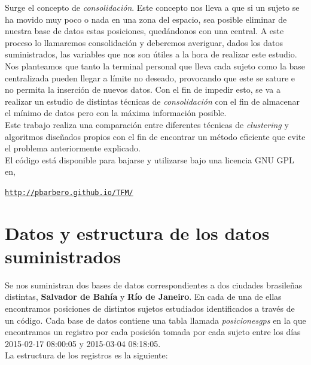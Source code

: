 \documentclass[a4paper, 12pt]{article}
\begin{document}
Surge el concepto de \textit{consolidaci\'on}. Este concepto nos lleva a que si un sujeto se ha movido muy poco o nada en una zona del espacio, sea posible eliminar de nuestra base de datos estas posiciones, qued\'andonos con una central. A este proceso lo llamaremos consolidaci\'on y deberemos averiguar, dados los datos suministrados, las variables que nos son \'utiles a la hora de realizar este estudio.\\

Nos planteamos que tanto la terminal personal que lleva cada sujeto como la base centralizada pueden llegar a l\'imite no deseado, provocando que este se sature e no permita la inserci\'on de nuevos datos. Con el fin de impedir esto, se va a realizar un estudio de distintas t\'ecnicas de \textit{consolidaci\'on} con el fin de almacenar el m\'inimo de datos pero con la m\'axima informaci\'on posible. \\

Este trabajo realiza una comparaci\'on entre diferentes t\'ecnicas de \textit{clustering} y algoritmos dise\~nados propios con el fin de encontrar un m\'etodo eficiente que evite el problema anteriormente explicado. \\

El c\'odigo est\'a disponible para bajarse y utilizarse bajo una licencia GNU GPL en,\\

\begin{center}\label{pbarbero}
	\href{http://pbarbero.github.io/TFM/}{\texttt{http://pbarbero.github.io/TFM/}}
\end{center}


\pagebreak

\section{Datos y estructura de los datos suministrados}

Se nos suministran dos bases de datos correspondientes a dos ciudades brasile\~nas distintas, \textbf{Salvador de Bah\'ia} y \textbf{R\'io de Janeiro}. En cada de una de ellas encontramos posiciones de distintos sujetos estudiados identificados a trav\'es de un c\'odigo. Cada base de datos contiene una tabla llamada \textit{posicionesgps} en la que encontramos un registro por cada posici\'on tomada por cada sujeto entre los d\'ias 2015-02-17 08:00:05 y 2015-03-04 08:18:05. \\

La estructura de los registros es la siguiente:
\end{document}
